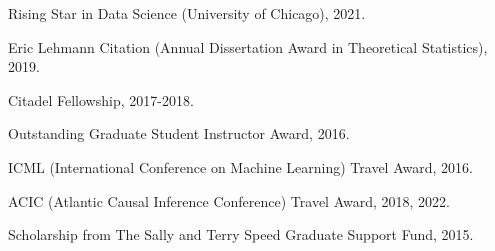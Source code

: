 \documentclass{article}
\begin{document}
Rising Star in Data Science (University of Chicago), 2021.

\vspace{2mm}

Eric Lehmann Citation (Annual Dissertation Award in Theoretical Statistics), 2019.

\vspace{2mm}

Citadel Fellowship, 2017-2018.

\vspace{2mm}

Outstanding Graduate Student Instructor Award, 2016.

\vspace{2mm}
ICML (International Conference on Machine Learning) Travel Award, 2016.

\vspace{2mm}
ACIC (Atlantic Causal Inference Conference) Travel Award, 2018, 2022.

\vspace{2mm}
Scholarship from The Sally and Terry Speed Graduate Support Fund, 2015.





\end{document}
